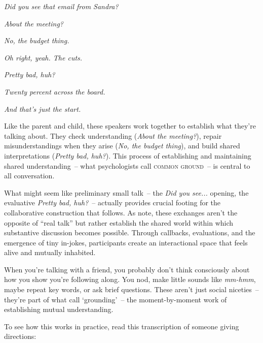 \ea
\begin{dialogue}
\item[A] \textit{Did you see that email from Sandra?}
\item[B] \textit{About the meeting?}
\item[A] \textit{No, the budget thing.}
\item[B] \textit{Oh right, yeah. The cuts.}
\item[A] \textit{Pretty bad, huh?}
\item[B] \textit{Twenty percent across the board.}
\item[A] \textit{And that's just the start.}
\end{dialogue}
\z
Like the parent and child, these speakers work together to establish what they're talking about. They check understanding (\textit{About the meeting?}), repair misunderstandings when they arise (\textit{No, the budget thing}), and build shared interpretations (\textit{Pretty bad, huh?}). This process of establishing and maintaining shared understanding~-- what psychologists call \textsc{common ground}~-- is central to all conversation.

What might seem like preliminary small talk~-- the \textit{Did you see...} opening, the evaluative \textit{Pretty bad, huh?}~-- actually provides crucial footing for the collaborative construction that follows. As \citet{rossignacmilon_boothby_2025_smalltalk} note, these exchanges aren't the opposite of ``real talk'' but rather establish the shared world within which substantive discussion becomes possible. Through callbacks, evaluations, and the emergence of tiny in-jokes, participants create an interactional space that feels alive and mutually inhabited.

When you're talking with a friend, you probably don't think consciously about how you show you're following along. You nod, make little sounds like \textit{mm-hmm}, maybe repeat key words, or ask brief questions. These aren't just social niceties~-- they're part of what \citet{clark1991} call `grounding'~-- the moment-by-moment work of establishing mutual understanding.

To see how this works in practice, read this transcription of someone giving directions:

